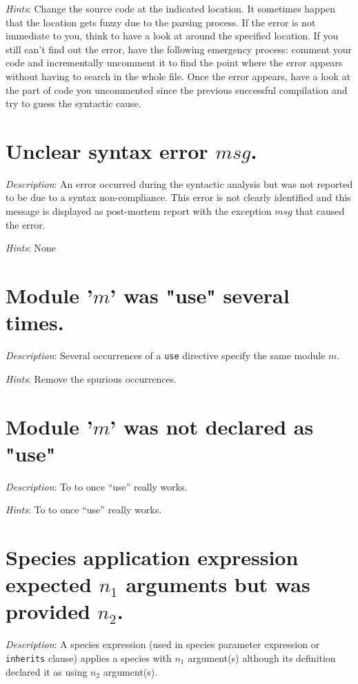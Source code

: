 {\em Hints}: Change the source code at the indicated location. It
sometimes happen that the location gets fuzzy due to the parsing
process. If the error is not immediate to you, think to have a look at
around the specified location. If you still can't find out the error,
have the following emergency process: comment your code and
incrementally uncomment it to find the point where the error appears
without having to search in the whole file. Once the error appears,
have a look at the part of code you uncommented since the previous
successful compilation and try to guess the syntactic cause.



\section*{Unclear syntax error $msg$.}
{\em Description}: An error occurred during the syntactic analysis but
was not reported to be due to a syntax non-compliance. This error is
not clearly identified and this message is displayed as post-mortem
report with the exception $msg$ that caused the error.

{\em Hints}: None



\section*{Module '$m$' was "use" several times.}
{\em Description}: Several occurrences of a {\tt use} directive
specify the same module $m$.

{\em Hints}: Remove the spurious occurrences.



\section*{Module '$m$' was not declared as "use"}
{\em Description}: {\color{red}To to once ``use'' really works.}

{\em Hints}: {\color{red}To to once ``use'' really works.}



\section*{Species application expression expected $n_1$ arguments but
  was provided $n_2$.}
{\em Description}: A species expression (used in species parameter
expression or {\tt inherits} clause) applies a species with $n_1$
argument(s) although its definition declared it as using $n_2$
argument(s).

